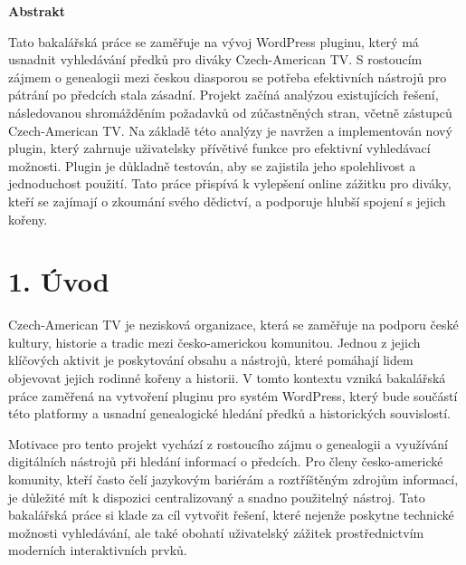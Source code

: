 \documentclass[12pt]{report}
\begin{document}
\newpage
\begin{center}
    \textbf{\Huge Abstrakt} %
\end{center}

\vspace{1cm}
Tato bakalářská práce se zaměřuje na vývoj WordPress pluginu, který má usnadnit vyhledávání předků pro diváky Czech-American TV. S rostoucím zájmem o genealogii mezi českou diasporou se potřeba efektivních nástrojů pro pátrání po předcích stala zásadní. Projekt začíná analýzou existujících řešení, následovanou shromážděním požadavků od zúčastněných stran, včetně zástupců Czech-American TV. Na základě této analýzy je navržen a implementován nový plugin, který zahrnuje uživatelsky přívětivé funkce pro efektivní vyhledávací možnosti. Plugin je důkladně testován, aby se zajistila jeho spolehlivost a jednoduchost použití. Tato práce přispívá k vylepšení online zážitku pro diváky, kteří se zajímají o zkoumání svého dědictví, a podporuje hlubší spojení s jejich kořeny.

\newpage  %


\tableofcontents  %

\newpage


\section{1. Úvod}
\vspace{1cm}
Czech-American TV je nezisková organizace, která se zaměřuje na podporu české kultury, historie a tradic mezi česko-americkou komunitou. Jednou z jejich klíčových aktivit je poskytování obsahu a nástrojů, které pomáhají lidem objevovat jejich rodinné kořeny a historii. V tomto kontextu vzniká bakalářská práce zaměřená na vytvoření pluginu pro systém WordPress, který bude součástí této platformy a usnadní genealogické hledání předků a historických souvislostí.

Motivace pro tento projekt vychází z rostoucího zájmu o genealogii a využívání digitálních nástrojů při hledání informací o předcích. Pro členy česko-americké komunity, kteří často čelí jazykovým bariérám a roztříštěným zdrojům informací, je důležité mít k dispozici centralizovaný a snadno použitelný nástroj. Tato bakalářská práce si klade za cíl vytvořit řešení, které nejenže poskytne technické možnosti vyhledávání, ale také obohatí uživatelský zážitek prostřednictvím moderních interaktivních prvků.
\end{document}
